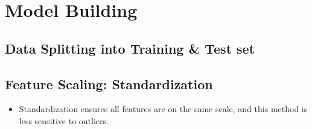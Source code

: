 \documentclass[
  letterpaper,
  DIV=11,
  numbers=noendperiod]{scrreprt}
\newenvironment{Shaded}{\begin{snugshade}}{\end{snugshade}}
\newcommand{\AttributeTok}[1]{\textcolor[rgb]{0.40,0.45,0.13}{#1}}
\newcommand{\CommentTok}[1]{\textcolor[rgb]{0.37,0.37,0.37}{#1}}
\newcommand{\ConstantTok}[1]{\textcolor[rgb]{0.56,0.35,0.01}{#1}}
\newcommand{\FloatTok}[1]{\textcolor[rgb]{0.68,0.00,0.00}{#1}}
\newcommand{\FunctionTok}[1]{\textcolor[rgb]{0.28,0.35,0.67}{#1}}
\newcommand{\NormalTok}[1]{\textcolor[rgb]{0.00,0.23,0.31}{#1}}
\newcommand{\OtherTok}[1]{\textcolor[rgb]{0.00,0.23,0.31}{#1}}
\newcommand{\SpecialCharTok}[1]{\textcolor[rgb]{0.37,0.37,0.37}{#1}}
\providecommand{\tightlist}{%
  \setlength{\itemsep}{0pt}\setlength{\parskip}{0pt}}\usepackage{longtable,booktabs,array}
\begin{document}
\hypertarget{model-building}{%
\section{Model Building}\label{model-building}}

\hypertarget{data-splitting-into-training-test-set}{%
\subsection{Data Splitting into Training \& Test
set}\label{data-splitting-into-training-test-set}}

\begin{Shaded}
\end{Shaded}

\hypertarget{feature-scaling-standardization}{%
\subsection{Feature Scaling:
Standardization}\label{feature-scaling-standardization}}

\begin{itemize}
\tightlist
\item
  Standardization ensures all features are on the same scale, and this
  method is less sensitive to outliers.
\end{itemize}
\end{document}
